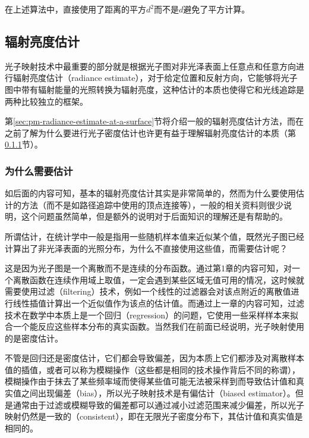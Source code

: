 在上述算法中，直接使用了距离的平方$d^2$而不是$d$避免了平方计算。





\subsection{辐射亮度估计}\label{sec:pm-radiance-estimate}
光子映射技术中最重要的部分就是根据光子图对非光泽表面上任意点和任意方向进行辐射亮度估计（radiance estimate），对于给定位置和反射方向，它能够将光子图中带有辐射能量的光照转换为辐射亮度，这种估计的本质也使得它和光线追踪是两种比较独立的框架。

第\ref{sec:pm-radiance-estimate-at-a-surface}节将介绍一般的辐射亮度估计方法，而在之前了解为什么要进行光子密度估计也许更有益于理解辐射亮度估计的本质（第\ref{sec:pm-why-radiance-estimate}节）。




\subsubsection{为什么需要估计}\label{sec:pm-why-radiance-estimate}
如后面的内容可知，基本的辐射亮度估计其实是非常简单的，然而为什么要使用估计的方法（而不是如路径追踪中使用的顶点连接等），一般的相关资料则很少说明，这个问题虽然简单，但是额外的说明对于后面知识的理解还是有帮助的。

所谓估计，在统计学中一般是指用一些随机样本值来近似某个值，既然光子图已经计算出了非光泽表面的光照分布，为什么不直接使用这些值，而需要估计呢？

这是因为光子图是一个离散而不是连续的分布函数。通过第1章的内容可知，对一个离散函数在连续作用域上取值，一定会遇到某些区域无值可用的情况，这时候就需要使用过滤（filtering）技术，例如一个线性的过滤器会对该点附近的离散值进行线性插值计算出一个近似值作为该点的估计值。而通过上一章的内容可知，过滤技术在数学中本质上是一个回归（regression）的问题，它使用一些采样样本来拟合一个能反应这些样本分布的真实函数。当然我们在前面已经说明，光子映射使用的是密度估计。

不管是回归还是密度估计，它们都会导致偏差，因为本质上它们都涉及对离散样本值的插值，或者可以称为模糊操作（这些都是相同的技术操作背后不同的称谓），模糊操作由于抹去了某些频率域而使得某些值可能无法被采样到而导致估计值和真实值之间出现偏差（bias），所以光子映射技术是有偏估计（biased estimator）。但是通常由于过滤或模糊导致的偏差都可以通过减小过滤范围来减少偏差，所以光子映射仍然是一致的（consistent），即在无限光子密度分布下，其估计值和真实值是相同的。





